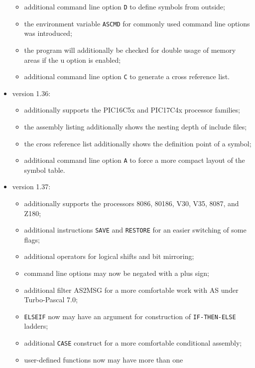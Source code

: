 \documentclass[12pt,twoside]{report}
\newcommand{\tty}[1]{{\tt #1}}
\begin{document}
\begin{itemize}
{\begin{itemize}
{            functions;}
      \item{additional command line option \tty{D} to define symbols
            from outside;}
      \item{the environment variable \tty{ASCMD} for commonly used
            command line options was introduced;}
      \item{the program will additionally be checked for double
            usage of memory areas if the u option is enabled;}
      \item{additional command line option \tty{C} to generate a cross
            reference list.}
      \end{itemize}}
\item{version 1.36:
      \begin{itemize}
      \item{additionally supports the PIC16C5x and PIC17C4x 
            processor families;}
      \item{the assembly listing additionally shows the nesting
            depth of include files;}
      \item{the cross reference list additionally shows the
            definition point of a symbol;}
      \item{additional command line option \tty{A} to force a more
            compact layout of the symbol table.}
      \end{itemize}}
\item{version 1.37:
      \begin{itemize}
      \item{additionally supports the processors 8086, 80186,
            V30, V35, 8087, and Z180;}
      \item{additional instructions \tty{SAVE} and \tty{RESTORE} for an
            easier switching of some flags;}
      \item{additional operators for logical shifts and bit
            mirroring;}
      \item{command line options may now be negated with a
            plus sign;}
      \item{additional filter AS2MSG for a more comfortable
            work with AS under Turbo-Pascal 7.0;}
      \item{\tty{ELSEIF} now may have an argument for construction
            of \tty{IF\--THEN\--ELSE} ladders;}
      \item{additional \tty{CASE} construct for a more comfortable
            conditional assembly;}
      \item{user-defined functions now may have more than one
}
\end{itemize}}
\end{itemize}
\end{document}
